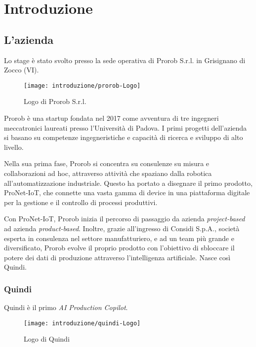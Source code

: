 \chapter{Introduzione}
\label{cap:introduzione}


\section{L'azienda}

Lo stage è stato svolto presso la sede operativa di Prorob S.r.l. in Grisignano di Zocco (VI).

\begin{figure}[!ht] 
    \centering 
    \texttt{[image: introduzione/prorob-Logo]} 
    \caption{Logo di Prorob S.r.l.}
\end{figure}

Prorob è una startup fondata nel 2017 come avventura di tre ingegneri meccatronici laureati presso l'Università di Padova.
I primi progetti dell'azienda si basano su competenze ingegneristiche e capacità di ricerca e sviluppo di alto livello.

Nella sua prima fase, Prorob si concentra su consulenze su misura e collaborazioni ad hoc, attraverso attività che spaziano dalla robotica all'automatizzazione industriale.
Questo ha portato a disegnare il primo prodotto, ProNet-IoT, che connette una vasta gamma di device in una piattaforma digitale per la gestione e il controllo di processi produttivi.

Con ProNet-IoT, Prorob inizia il percorso di passaggio da azienda \emph{project-based} ad azienda \emph{product-based}.
Inoltre, grazie all'ingresso di Considi S.p.A., società esperta in consulenza nel settore manufatturiero, e ad un team più grande e diversificato, Prorob evolve il proprio prodotto con l'obiettivo di sbloccare il potere dei dati di produzione attraverso l'intelligenza artificiale. Nasce così Quindi.

\bigskip
\vfill
\hfill

\subsection{Quindi}
Quindi è il primo \emph{\gls{AI} Production Copilot}.

\bigskip

\begin{figure}[!ht] 
    \centering 
    \texttt{[image: introduzione/quindi-Logo]} 
    \caption{Logo di Quindi}
\end{figure}

